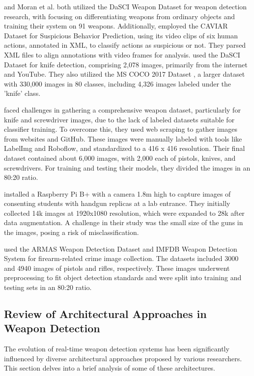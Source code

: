 \citet{rfc7} and Moran et al. \citet{rfc18} both utilized the DaSCI Weapon Dataset \cite{rfc29} for weapon detection research, with \citet{rfc7} focusing on differentiating weapons from ordinary objects and training their system on 91 weapons. Additionally, employed the CAVIAR Dataset \cite{rfc30} for Suspicious Behavior Prediction, using its video clips of six human actions, annotated in XML, to classify actions as suspicious or not. They parsed XML files to align annotations with video frames for analysis. \citet{rfc18} used the DaSCI Dataset \cite{rfc29} for knife detection, comprising 2,078 images, primarily from the internet and YouTube. They also utilized the MS COCO 2017 Dataset \cite{rfc16}, a larger dataset with 330,000 images in 80 classes, including 4,326 images labeled under the 'knife' class.

\citet{rfc17} faced challenges in gathering a comprehensive weapon dataset, particularly for knife and screwdriver images, due to the lack of labeled datasets suitable for classifier training. To overcome this, they used web scraping to gather images from websites and GitHub. These images were manually labeled with tools like LabelImg and Roboflow, and standardized to a 416 x 416 resolution. Their final dataset contained about 6,000 images, with 2,000 each of pistols, knives, and screwdrivers. For training and testing their models, they divided the images in an 80:20 ratio.

\citet{rfc19} installed a Raspberry Pi B+ with a camera 1.8m high to capture images of consenting students with handgun replicas at a lab entrance. They initially collected 14k images at 1920x1080 resolution, which were expanded to 28k after data augmentation. A challenge in their study was the small size of the guns in the images, posing a risk of misclassification.

\citet{rfc20} used the ARMAS Weapon Detection Dataset and IMFDB Weapon Detection System \cite{rfc28} for firearm-related crime image collection. The datasets included 3000 and 4940 images of pistols and rifles, respectively. These images underwent preprocessing to fit object detection standards and were split into training and testing sets in an 80:20 ratio.

\subsection{Review of Architectural Approaches in Weapon Detection}
The evolution of real-time weapon detection systems has been significantly influenced by diverse architectural approaches proposed by various researchers. This section delves into a brief analysis of some of these architectures.

